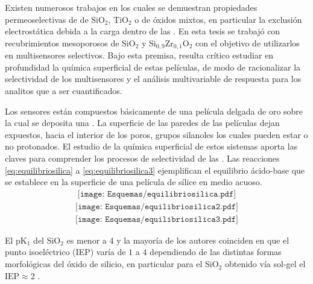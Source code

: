 	Existen numerosos trabajos en los cuales se demuestran propiedades permeoselectivas de \pdm\space de SiO$_2$, TiO$_2$ o de óxidos mixtos, en particular la exclusión electrostática debida a la carga dentro de las \pdm. \cite{walcarius2013,Andrieu-Brunsen2015,Etienne2013,Calvo2009,brunsen2011} En esta tesis se trabajó con recubrimientos mesoporosos de SiO$_2$ y Si$_{0,9}$Zr$_{0,1}$O$_2$ con el objetivo de utilizarlos en multisensores selectivos. Bajo esta premisa, resulta crítico estudiar en profundidad la química superficial de estas películas, de modo de racionalizar la selectividad de los multisensores y el análisis multivariable de respuesta para los analitos que a ser cuantificados. 

	Los sensores están compuestos básicamente de una película delgada de oro sobre la cual se deposita una \pdm. La superficie de las paredes de las películas dejan expuestos, hacia el interior de los poros, grupos silanoles los cuales pueden estar o no protonados. El estudio de la química superficial de estos sistemas aporta las claves para comprender los procesos de selectividad de las \pdm.\cite{Brinker1990,Soler-Illia2011} Las reacciones \ref{eq:equilibriosilica} a \ref{eq:equilibriosilica3} ejemplifican el equilibrio ácido-base que se establece en la superficie de una película de sílice en medio acuoso.\cite{Lowe2015} 
			\begin{equation}
				\begin{aligned}
				\texttt{[image: Esquemas/equilibriosilica.pdf]}
				\label{eq:equilibriosilica}
				\end{aligned}
				\end{equation}
			\begin{equation}
				\begin{aligned}
				\texttt{[image: Esquemas/equilibriosilica2.pdf]}
				\end{aligned}
				\label{eq:equilibriosilica2}
				\end{equation}
			\begin{equation}
				\begin{aligned}
				\texttt{[image: Esquemas/equilibriosilica3.pdf]}
				\label{eq:equilibriosilica3}
				\end{aligned}
				\end{equation}		
     
     El pK$_{1}$ del $\text{SiO}_2$ es menor a 4 y la mayoría de los autores coinciden en que el punto isoeléctrico (IEP) varía de $1$ a $4$ dependiendo de  las distintas formas morfológicas del óxido de silicio, en particular para el SiO$_2$ obtenido vía sol-gel el $\text{IEP}\approx 2$ \cite{Kosmulski2002,Kosmulski2014,Schwarz1984,Si-HanWu2013}.
     
